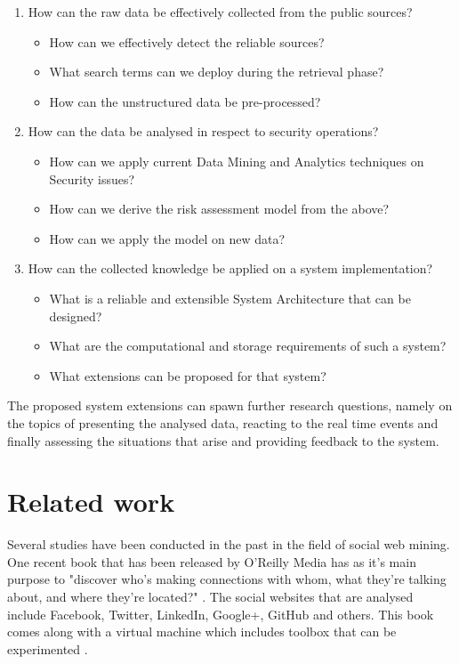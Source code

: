 \documentclass[12pt]{article}
\begin{document}
\begin{enumerate}
	\item How can the raw data be effectively collected from the public sources? 
	\begin{itemize}
		\item How can we effectively detect the reliable sources?
		\item What search terms can we deploy during the retrieval phase?
		\item How can the unstructured data be pre-processed? 
	\end{itemize}
	\item How can the data be analysed in respect to security operations?
	\begin{itemize}
		\item How can we apply current Data Mining and Analytics techniques on Security issues?
		\item How can we derive the risk assessment model from the above?
		\item How can we apply the model on new data?
	\end{itemize}
	\item	How can the collected knowledge be applied on a system implementation?
	\begin{itemize}
		\item What is a reliable and extensible System Architecture that can be designed?
		\item What are the computational and storage requirements of such a system?
		\item What extensions can be proposed for that system?
	\end{itemize}
\end{enumerate}

The proposed system extensions can spawn further research questions, namely on the topics of presenting the analysed data, reacting to the real time events and finally assessing the situations that arise and providing feedback to the system.


\section{Related work}

Several studies have been conducted in the past in the field of social web mining. One recent book that has been released by  O'Reilly Media has as it's main purpose to  "discover who’s making connections with whom, what they’re talking about, and where they’re located?" \cite{first}. The social websites that are analysed include Facebook, Twitter, LinkedIn, Google+, GitHub and others. This book comes along with a virtual machine which includes toolbox that can be experimented \cite{second}.
\end{document}
